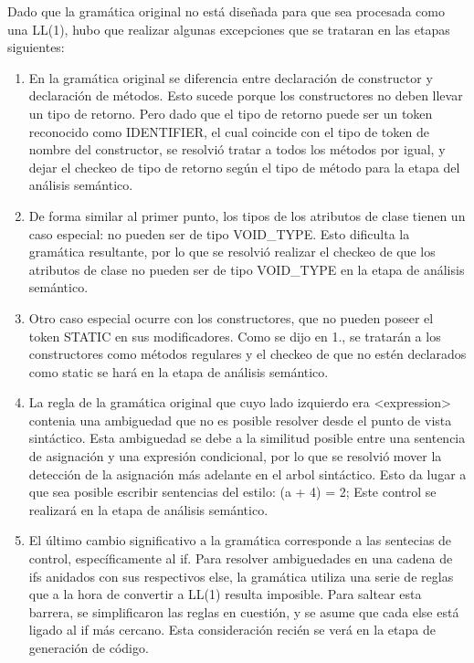 \documentclass [a4paper,abstracton,titlepage]{scrartcl}
\begin{document}
Dado que la gramática original no está diseñada para que sea procesada
como una LL(1), hubo que realizar algunas excepciones que se trataran
en las etapas siguientes:
  \begin{enumerate}
\item%
En la gramática original se diferencia entre declaración de
constructor y declaración de métodos. Esto sucede porque los
constructores no deben llevar un tipo de retorno. Pero dado que el
tipo de retorno puede ser un token reconocido como IDENTIFIER, el cual
coincide con el tipo de token de nombre del constructor, se resolvió
tratar a todos los métodos por igual, y dejar el checkeo de tipo de
retorno según el tipo de método para la etapa del análisis
semántico.

\item%
De forma similar al primer punto, los tipos de los atributos de clase tienen
un caso especial: no pueden ser de tipo VOID\_{}TYPE. Esto dificulta la
gramática resultante, por lo que se resolvió realizar el checkeo de
que los atributos de clase no pueden ser de tipo VOID\_{}TYPE en la etapa
de análisis semántico.

\item%
Otro caso especial ocurre con los constructores, que no pueden
poseer el token STATIC en sus modificadores. Como se dijo en 1., se
tratarán a los constructores como métodos regulares y el checkeo de
que no estén declarados como static se hará en la etapa de análisis
semántico.

\item%
La regla de la gramática original que cuyo lado izquierdo era
\textless{}expression\textgreater{} contenia una ambiguedad que no es posible resolver desde
el punto de vista sintáctico. Esta ambiguedad se debe a la similitud
posible entre una sentencia de asignación y una expresión condicional,
por lo que se resolvió mover la detección de la asignación más
adelante en el arbol sintáctico. Esto da lugar a que sea posible
escribir sentencias del estilo: (a + 4) = 2;
   Este control se realizará en la etapa de análisis semántico.

\item%
El último cambio significativo a la gramática corresponde a las
sentecias de control, específicamente al if. Para resolver
ambiguedades en una cadena de ifs anidados con sus respectivos else,
la gramática utiliza una serie de reglas que a la hora de convertir a
LL(1) resulta imposible. Para saltear esta barrera, se simplificaron
las reglas en cuestión, y se asume que cada else está ligado al if más
cercano.
Esta consideración recién se verá en la etapa de generación de
código.

\end{enumerate}
\hypertarget{_gramática_bnf_sin_extensiones}{}
\end{document}
